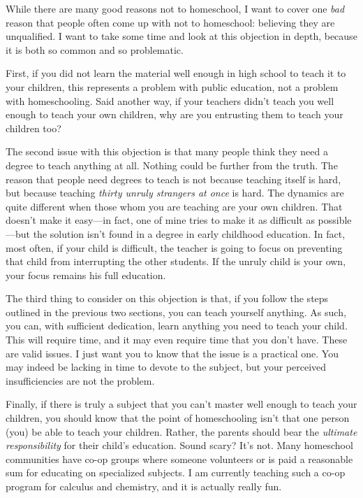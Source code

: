 While there are many good reasons not to homeschool, I want to cover one
\textit{bad} reason that people often come up with not to homeschool:
believing they are
unqualified.  I want to take some time and look at this objection in
depth, because it is both so common and so problematic. 

First, if you did not
learn the material well enough in high school to teach it to your
children, this represents a problem with public education, not a
problem with homeschooling.
Said another way, if
your teachers didn’t teach you well enough to teach your own children,
why are you entrusting them to teach your children too?  

The second issue with this objection is that many people think they need
a degree to teach anything at all. Nothing could be further from the
truth. The reason that people need degrees to teach is not because
teaching itself is hard, but because teaching \textit{thirty unruly
strangers at once} is hard. The dynamics are quite different when
those whom you are
teaching are your own children. That doesn’t make it easy—in fact, one
of mine tries to make it as difficult as possible—but the solution
isn’t found in a degree in early childhood education. In fact, most
often, if your child is difficult, the teacher is going to focus on
preventing that child from interrupting the other students. If the
unruly child is your own, your focus remains his full education.

The third thing to consider on this objection is that, if you follow the
steps outlined in the previous two sections, you can teach yourself
anything. As such, you can, with sufficient dedication, learn anything
you need to teach your child. This will require time, and it may even
require time that you don’t have. These are valid issues. I just want
you to know that the issue is a practical one. 
You may indeed be
lacking in time to devote to the subject, but your perceived
insufficiencies are not the problem. 

Finally, if there is truly a subject that you can’t master well enough
to teach your children, you should know that the point of homeschooling
isn’t that one person (you) be able to teach your children.
Rather, the parents
should bear the \textit{ultimate responsibility} for their child’s education.
Sound scary? It’s not.
Many homeschool communities have co-op groups where someone volunteers
or is paid a reasonable sum for educating on specialized subjects. I am
currently teaching such a co-op program for calculus and chemistry, and
it is actually really fun.

